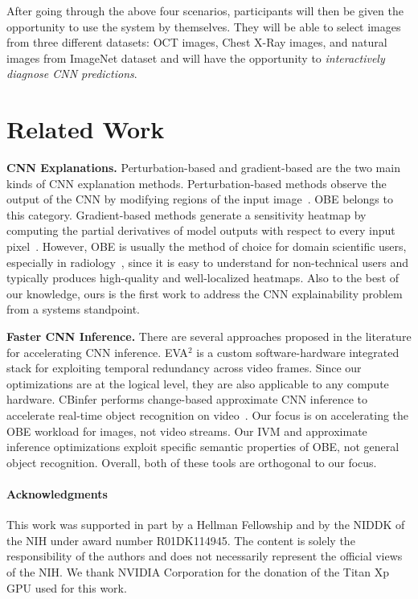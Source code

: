 \documentclass{vldb}
\begin{document}
\vspace{2mm}
After going through the above four scenarios, participants will then be given the opportunity to use the system by themselves.
They will be able to select images from three different datasets: OCT images, Chest X-Ray images, and natural images from ImageNet dataset and will have the opportunity to \textit{interactively diagnose CNN predictions}.

\section{Related Work}

\noindent \textbf{CNN Explanations.} Perturbation-based and gradient-based are the two main kinds of CNN explanation methods. Perturbation-based methods observe the output of the CNN by modifying regions of the input image~\cite{zeiler2014visualizing}. OBE belongs to this category.
Gradient-based methods generate a sensitivity heatmap by computing the partial derivatives of model outputs with respect to every input pixel~\cite{simonyan2013deep}.
However, OBE is usually the method of choice for domain scientific users, especially in radiology~\cite{jung2017deep,miller2017explanation}, since it is easy to understand for non-technical users and typically produces high-quality and well-localized heatmaps.
Also to the best of our knowledge, ours is the first work to address the CNN explainability problem from a systems standpoint.

\vspace{2mm}
\noindent \textbf{Faster CNN Inference.} There are several approaches proposed in the literature for accelerating CNN inference.
EVA$^2$ \cite{buckler2018eva} is a custom software-hardware integrated stack for exploiting temporal redundancy across video frames. Since our optimizations are at the logical level, they are also applicable to any compute hardware.
CBinfer performs change-based approximate CNN inference to accelerate real-time object recognition on video~\cite{cavigelli2017cbinfer}. Our focus is on accelerating the OBE workload for images, not video streams. Our IVM and approximate inference optimizations exploit specific semantic properties of OBE, not general object recognition. Overall, both of these tools are orthogonal to our focus.

\paragraph*{Acknowledgments} This work was supported in part by a Hellman Fellowship and by the NIDDK of the NIH under award number R01DK114945. The content is solely the responsibility of the authors and does not necessarily represent the official views of the NIH. We thank NVIDIA Corporation for the donation of the Titan Xp GPU used for this work.

\balance



\end{document}
